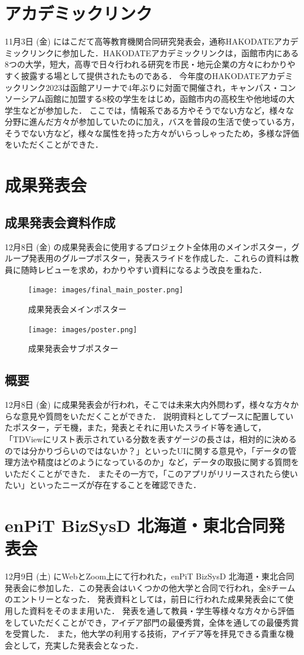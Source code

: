 \section{アカデミックリンク}
11月3日 (金) にはこだて高等教育機関合同研究発表会，通称HAKODATEアカデミックリンクに参加した．HAKODATEアカデミックリンクは，函館市内にある8つの大学，短大，高専で日々行われる研究を市民・地元企業の方々にわかりやすく披露する場として提供されたものである．
今年度のHAKODATEアカデミックリンク2023は函館アリーナで4年ぶりに対面で開催され，キャンパス・コンソーシアム函館に加盟する8校の学生をはじめ，函館市内の高校生や他地域の大学生などが参加した．
ここでは，情報系である方やそうでない方など，様々な分野に進んだ方々が参加していたのに加え，バスを普段の生活で使っている方，そうでない方など，様々な属性を持った方々がいらっしゃったため，多様な評価をいただくことができた．

\section{成果発表会}
\subsection{成果発表会資料作成}
12月8日 (金) の成果発表会に使用するプロジェクト全体用のメインポスター，グループ発表用のグループポスター，発表スライドを作成した．これらの資料は教員に随時レビューを求め，わかりやすい資料になるよう改良を重ねた．

\begin{figure}[H]
    \centering
    \texttt{[image: images/final\_main\_poster.png]}
    \caption{成果発表会メインポスター}
    \label{fig:final_main_poster}
\end{figure}

\begin{figure}[H]
    \centering
    \texttt{[image: images/poster.png]}
    \caption{成果発表会サブポスター}
    \label{fig:poster}
\end{figure}


\subsection{概要}
12月8日 (金) に成果発表会が行われ，そこでは未来大内外問わず，様々な方々からな意見や質問をいただくことができた．
説明資料としてブースに配置していたポスター，デモ機，また，発表とそれに用いたスライド等を通して，「TDViewにリスト表示されている分数を表すゲージの長さは，相対的に決めるのでは分かりづらいのではないか？」といったUIに関する意見や，「データの管理方法や精度はどのようになっているのか」など，データの取扱に関する質問をいただくことができた．
またその一方で，「このアプリがリリースされたら使いたい」といったニーズが存在することを確認できた．

\section{enPiT BizSysD 北海道・東北合同発表会}
12月9日 (土) にWebとZoom上にて行われた，enPiT BizSysD 北海道・東北合同発表会に参加した．この発表会はいくつかの他大学と合同で行われ，全8チームのエントリーとなった．
発表資料としては，前日に行われた成果発表会にて使用した資料をそのまま用いた．
発表を通して教員・学生等様々な方々から評価をしていただくことができ，アイデア部門の最優秀賞，全体を通しての最優秀賞を受賞した．
また，他大学の利用する技術，アイデア等を拝見できる貴重な機会として，充実した発表会となった．
